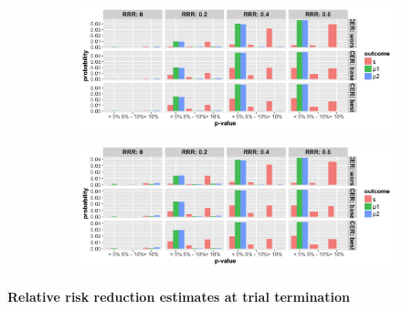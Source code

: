 \documentclass[]{article}
\let\oldparagraph\paragraph
\renewcommand{\paragraph}[1]{\oldparagraph{#1}\mbox{}}
\begin{document}
\begin{figure}
\centering
  \caption{Probability that the p-value (from Fisher’s exact test) at termination of the trial is below 5\%, between 5\%
  and 10\% and greater than 10\% for cases where trial was stopped for superiority of (a) B.I or (b) L.P. The rows
  represent the three control even rate scenarios and the four columns present four relative risk reduction scenarios.
  Note: In the figures below, the denominator in each figure is the number of simulations (not the number of trials
  stopped for futility or superiority, and thus, the proportions do not add up to 100\% within one figure. Further, the
  figures do not include simulations where the trial went to the maximum allowed sample size. The bars should be
  interpreted with respect to the relative proportion that fit in each category.}
  \begin{subfigure}{0.8\textwidth}
    \centering
    \caption{}
    \includegraphics{../plots/3arm/p_value_supbi_3arm.png}
  \end{subfigure}
  \bigbreak
  \begin{subfigure}{0.8\textwidth}
    \centering
    \caption{}
    \includegraphics{../plots/3arm/p_value_suplp_3arm.png}
  \end{subfigure}
\end{figure}

\hypertarget{relative-risk-reduction-estimates-at-trial-termination-1}{%
\paragraph{Relative risk reduction estimates at trial
termination}\label{relative-risk-reduction-estimates-at-trial-termination-1}}
\end{document}
